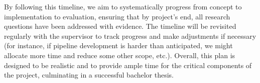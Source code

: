 \documentclass[
oneside,      %
openany       %
]{imc-inf}
\begin{document}
	\vspace{1.5em}
	
	By following this timeline, we aim to systematically progress from concept to implementation to evaluation, ensuring that by project’s end, all research questions have been addressed with evidence. The timeline will be revisited regularly with the supervisor to track progress and make adjustments if necessary (for instance, if pipeline development is harder than anticipated, we might allocate more time and reduce some other scope, etc.). Overall, this plan is designed to be realistic and to provide ample time for the critical components of the project, culminating in a successful bachelor thesis.
	
	
	
	
	\typeout{}
	
	
	
\end{document}
